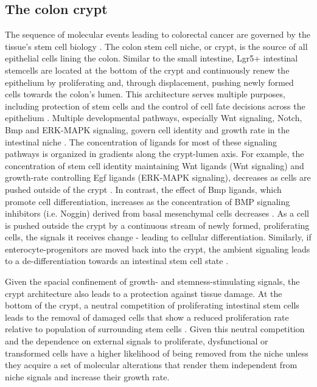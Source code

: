 \begin{flushleft}
\subsection{The colon crypt}
The sequence of molecular events leading to colorectal cancer are governed by the tissue's stem cell biology \parencite{cleversCancerStemCell2011}. The colon stem cell niche, or crypt, is the source of all epithelial cells lining the colon. Similar to the small intestine, Lgr5+ intestinal stemcells are located at the bottom of the crypt and continuously renew the epithelium by proliferating and, through displacement, pushing newly formed cells towards the colon's lumen. This architecture serves multiple purposes, including protection of stem cells and the control of cell fate decisions across the epithelium \parencite{cleversIntestinalCryptPrototype2013a}. Multiple developmental pathways, especially Wnt signaling, Notch, Bmp and ERK-MAPK signaling, govern cell identity and growth rate in the intestinal niche \parencite{hTalesCryptNew2019}. The concentration of ligands for most of these signaling pathways is organized in gradients along the crypt-lumen axis. For example, the concentration of stem cell identity maintaining Wnt ligands (Wnt signaling) and growth-rate controlling Egf ligands (ERK-MAPK signaling), decreases as cells are pushed outside of the crypt \parencite{sasakiReg4DeepCrypt2016}. In contrast, the effect of Bmp ligands, which promote cell differentiation, increases as the concentration of BMP signaling inhibitors (i.e. Noggin) derived from basal mesenchymal cells decreases \parencite{heBMPSignalingInhibits2004}. As a cell is pushed outside the crypt by a continuous stream of newly formed, proliferating cells, the signals it receives change - leading to cellular differentiation. Similarly, if enterocyte-progenitors are moved back into the crypt, the ambient signaling leads to a de-differentiation towards an intestinal stem cell state \parencite{tettehReplacementLostLgr5Positive2016a}. \par

Given the spacial confinement of growth- and stemness-stimulating signals, the crypt architecture also leads to a protection against tissue damage. At the bottom of the crypt, a neutral competition of proliferating intestinal stem cells leads to the removal of damaged cells that show a reduced proliferation rate relative to population of surrounding stem cells \parencite{snippertIntestinalCryptHomeostasis2010a}. Given this neutral competition and the dependence on external signals to proliferate, dysfunctional or transformed cells have a higher likelihood of being removed from the niche unless they acquire a set of molecular alterations that render them independent from niche signals and increase their growth rate. \par


\end{flushleft}
